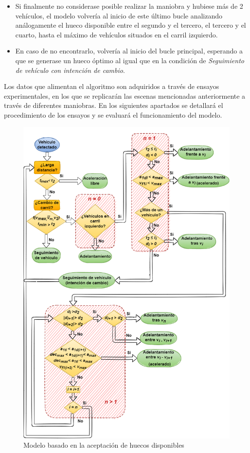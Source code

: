 \begin{itemize}
    \item Si finalmente no considerase posible realizar la maniobra y hubiese más de 2 vehículos, el modelo volvería al inicio de este último bucle analizando análogamente el hueco disponible entre el segundo y el tercero, el tercero y el cuarto, hasta el máximo de vehículos situados en el carril izquierdo.
    \item En caso de no encontrarlo, volvería al inicio del bucle principal, esperando a que se generase un hueco óptimo al igual que en la condición de \emph{Seguimiento de vehículo con intención de cambio}.  
\end{itemize}


Los datos que alimentan el algoritmo son adquiridos a través de ensayos experimentales, en los que se replicarán las escenas mencionadas anteriormente a través de diferentes maniobras. En los siguientes apartados se detallará el procedimiento de los ensayos y se evaluará el funcionamiento del modelo.

\begin{figure}[htbp]
    \centering
    \includegraphics[width=14cm]
    {figures/5.3.png}
    \caption{ \label{fig:5.3} Modelo basado en la aceptación de huecos disponibles}
\end{figure}

